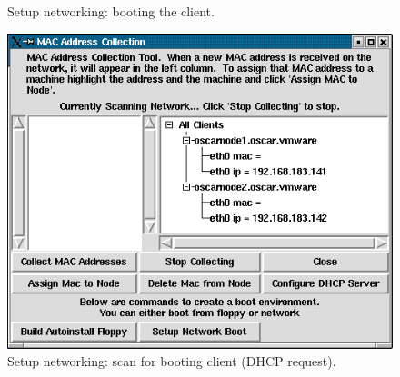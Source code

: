 
\begin{figure}[h!]
  \begin{center}
    \centerline{
      }
    \caption{Setup networking: booting the client.}
    \label{fig:sbs-collect-boot1}
  \end{center}
\end{figure}

\begin{figure}[h!]
  \begin{center}
    \centerline{
      \includegraphics[scale=\imgscale]{figs/6ca_sbs-client-boot1}}
    \caption{Setup networking: scan for booting client (DHCP request).}
    \label{fig:sbs-client-boot2}
  \end{center}
\end{figure}

